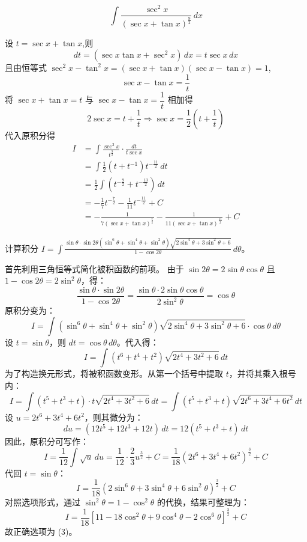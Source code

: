 \begin{questions}
    \question
    \[
    \int \frac{\sec^2 x}{(\sec x + \tan x)^{\frac{9}{2}}} \,dx
    \]
    \begin{solution}
        设 $t = \sec x + \tan x$,则
        \[
        dt = (\sec x \tan x + \sec^2 x) \,dx = t \sec x \,dx
        \]
        且由恒等式 $\sec^2 x - \tan^2 x = (\sec x + \tan x)(\sec x - \tan x) = 1$,
        \[
        \sec x - \tan x = \frac{1}{t}
        \]
        将 $\sec x + \tan x = t$ 与 $\sec x - \tan x = \dfrac{1}{t}$ 相加得
        \[
        2 \sec x = t + \frac{1}{t} \Rightarrow \sec x = \frac{1}{2} \left( t + \frac{1}{t} \right)
        \]
        代入原积分得
        \begin{align*}
        I &= \int \frac{\sec^2 x}{t^{\frac{9}{2}}} \cdot \frac{dt}{t \sec x} \\
        &= \int \frac{1}{2}(t + t^{-1}) t^{-\frac{11}{2}} \,dt \\
        &= \frac{1}{2} \int (t^{-\frac{9}{2}} + t^{-\frac{13}{2}}) \,dt \\
        &= -\frac{1}{7} t^{-\frac{7}{2}} - \frac{1}{11} t^{-\frac{11}{2}} + C \\
        &= -\frac{1}{7(\sec x + \tan x)^{\frac{7}{2}}} - \frac{1}{11(\sec x + \tan x)^{\frac{11}{2}}} + C
        \end{align*}
    \end{solution}

    \question
计算积分 $I = \int \frac{\sin \theta \cdot \sin 2\theta (\sin^6 \theta + \sin^4 \theta + \sin^2 \theta)\sqrt{2\sin^4 \theta + 3\sin^2 \theta + 6}}{1 - \cos 2\theta} \,d\theta$。

\begin{solution}
首先利用三角恒等式简化被积函数的前项。
由于 $\sin 2\theta = 2\sin \theta \cos \theta$ 且 $1 - \cos 2\theta = 2\sin^2 \theta$，得：
\[
\frac{\sin \theta \cdot \sin 2\theta}{1 - \cos 2\theta} = \frac{\sin \theta \cdot 2\sin \theta \cos \theta}{2\sin^2 \theta} = \cos \theta
\]
原积分变为：
\[
I = \int (\sin^6 \theta + \sin^4 \theta + \sin^2 \theta)\sqrt{2\sin^4 \theta + 3\sin^2 \theta + 6} \cdot \cos \theta \,d\theta
\]
设 $t = \sin \theta$，则 $dt = \cos \theta \,d\theta$。代入得：
\[
I = \int (t^6 + t^4 + t^2) \sqrt{2t^4 + 3t^2 + 6} \,dt
\]
为了构造换元形式，将被积函数变形。从第一个括号中提取 $t$，并将其乘入根号内：
\[
I = \int (t^5 + t^3 + t) \cdot t \sqrt{2t^4 + 3t^2 + 6} \,dt = \int (t^5 + t^3 + t) \sqrt{2t^6 + 3t^4 + 6t^2} \,dt
\]
设 $u = 2t^6 + 3t^4 + 6t^2$，则其微分为：
\[
du = (12t^5 + 12t^3 + 12t) \,dt = 12(t^5 + t^3 + t) \,dt
\]
因此，原积分可写作：
\[
I = \frac{1}{12} \int \sqrt{u} \,du = \frac{1}{12} \cdot \frac{2}{3} u^{\frac{3}{2}} + C = \frac{1}{18} (2t^6 + 3t^4 + 6t^2)^{\frac{3}{2}} + C
\]
代回 $t = \sin \theta$：
\[
I = \frac{1}{18} (2\sin^6 \theta + 3\sin^4 \theta + 6\sin^2 \theta)^{\frac{3}{2}} + C
\]
对照选项形式，通过 $\sin^2 \theta = 1 - \cos^2 \theta$ 的代换，结果可整理为：
\[
I = \frac{1}{18} [11 - 18\cos^2 \theta + 9\cos^4 \theta - 2\cos^6 \theta]^{\frac{3}{2}} + C
\]
故正确选项为 (3)。
\end{solution}


\end{questions}
